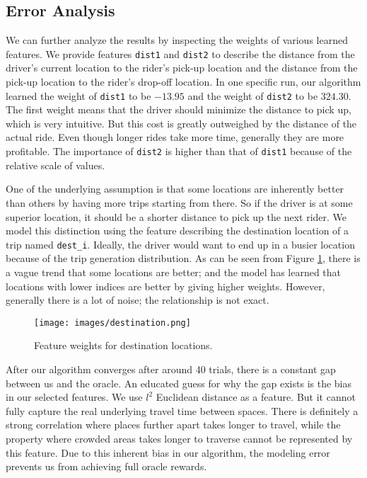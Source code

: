 \documentclass{article}
\begin{document}
\subsection{Error Analysis}

We can further analyze the results by inspecting the weights of various learned features. We provide features \texttt{dist1} and \texttt{dist2} to describe the distance from the driver's current location to the rider's pick-up location and the distance from the pick-up location to the rider's drop-off location. In one specific run, our algorithm learned the weight of \texttt{dist1} to be $-13.95$ and the weight of \texttt{dist2} to be $324.30$. The first weight means that the driver should minimize the distance to pick up, which is very intuitive. But this cost is greatly outweighed by the distance of the actual ride. Even though longer rides take more time, generally they are more profitable. The importance of \texttt{dist2} is higher than that of \texttt{dist1} because of the relative scale of values.

One of the underlying assumption is that some locations are inherently better than others by having more trips starting from there. So if the driver is at some superior location, it should be a shorter distance to pick up the next rider. We model this distinction using the feature describing the destination location of a trip named \texttt{dest\_i}. Ideally, the driver would want to end up in a busier location because of the trip generation distribution. As can be seen from Figure \ref{fig:destination}, there is a vague trend that some locations are better; and the model has learned that locations with lower indices are better by giving higher weights. However, generally there is a lot of noise; the relationship is not exact.

\begin{figure}[!htb]
\begin{center}
\texttt{[image: images/destination.png]}
\end{center}
\caption{Feature weights for destination locations.}
\label{fig:destination}
\end{figure}

After our algorithm converges after around 40 trials, there is a constant gap between us and the oracle. An educated guess for why the gap exists is the bias in our selected features. We use $l^{2}$ Euclidean distance as a feature. But it cannot fully capture the real underlying travel time between spaces. There is definitely a strong correlation where places further apart takes longer to travel, while the property where crowded areas takes longer to traverse cannot be represented by this feature. Due to this inherent bias in our algorithm, the modeling error prevents us from achieving full oracle rewards.
\end{document}
